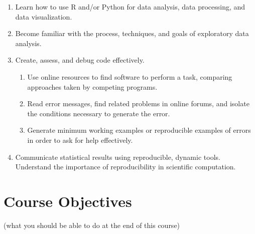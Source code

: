 \documentclass[
  11pt,
  letterpaper,
  DIV=11,
  numbers=noendperiod]{scrartcl}
\providecommand{\tightlist}{%
  \setlength{\itemsep}{0pt}\setlength{\parskip}{0pt}}\usepackage{longtable,booktabs,array}
\begin{document}
\begin{enumerate}
\def\labelenumi{\arabic{enumi}.}
\tightlist
\item
  Learn how to use R and/or Python for data analysis, data processing,
  and data visualization.
\item
  Become familiar with the process, techniques, and goals of exploratory
  data analysis.
\item
  Create, assess, and debug code effectively.

  \begin{enumerate}
  \def\labelenumii{\roman{enumii}.}
  \tightlist
  \item
    Use online resources to find software to perform a task, comparing
    approaches taken by competing programs.
  \item
    Read error messages, find related problems in online forums, and
    isolate the conditions necessary to generate the error.
  \item
    Generate minimum working examples or reproducible examples of errors
    in order to ask for help effectively.
  \end{enumerate}
\item
  Communicate statistical results using reproducible, dynamic tools.
  Understand the importance of reproducibility in scientific
  computation.
\end{enumerate}

\hypertarget{course-objectives}{%
\section{Course Objectives}\label{course-objectives}}

(what you should be able to do at the end of this course)
\end{document}

